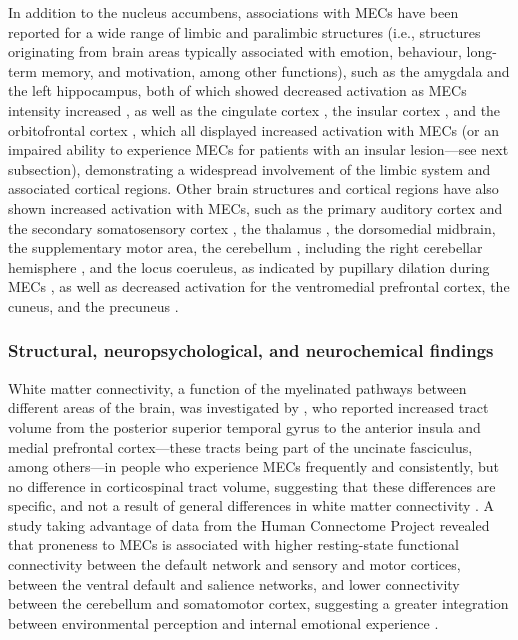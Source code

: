 In addition to the nucleus accumbens, associations with MECs have been reported for a wide range of limbic and paralimbic structures (i.e., structures originating from brain areas typically associated with emotion, behaviour, long-term memory, and motivation, among other functions), such as the amygdala \parencite{griffiths2004, grunkina2017} and the left hippocampus, both of which showed decreased activation as MECs intensity increased \parencite{blood2001}, as well as the cingulate cortex \parencite{blood2001}, the insular cortex \parencite{blood2001, griffiths2004, grunkina2017, klepzig2020}, and the orbitofrontal cortex \parencite{blood2001}, which all displayed increased activation with MECs (or an impaired ability to experience MECs for patients with an insular lesion---see next subsection), demonstrating a widespread involvement of the limbic system and associated cortical regions. Other brain structures and cortical regions have also shown increased activation with MECs, such as the primary auditory cortex and the secondary somatosensory cortex \parencite{grunkina2017}, the thalamus \parencite{blood2001, grunkina2017, klepzig2020}, the dorsomedial midbrain, the supplementary motor area, the cerebellum \parencite{blood2001}, including the right cerebellar hemisphere \parencite{klepzig2020}, and the locus coeruleus, as indicated by pupillary dilation during MECs \parencite{laeng2016}, as well as decreased activation for the ventromedial prefrontal cortex, the cuneus, and the precuneus \parencite{blood2001}.

\subsubsection{Structural, neuropsychological, and neurochemical findings}

White matter connectivity, a function of the myelinated pathways between different areas of the brain, was investigated by \textcite{sachs2016}, who reported increased tract volume from the posterior superior temporal gyrus to the anterior insula and medial prefrontal cortex---these tracts being part of the uncinate fasciculus, among others---in people who experience MECs frequently and consistently, but no difference in corticospinal tract volume, suggesting that these differences are specific, and not a result of general differences in white matter connectivity \parencite{sachs2016}. A study taking advantage of data from the Human Connectome Project \parencite{vanessen2013} revealed that proneness to MECs is associated with higher resting-state functional connectivity between the default network and sensory and motor cortices, between the ventral default and salience networks, and lower connectivity between the cerebellum and somatomotor cortex, suggesting a greater integration between environmental perception and internal emotional experience \parencite{williams2018}.

